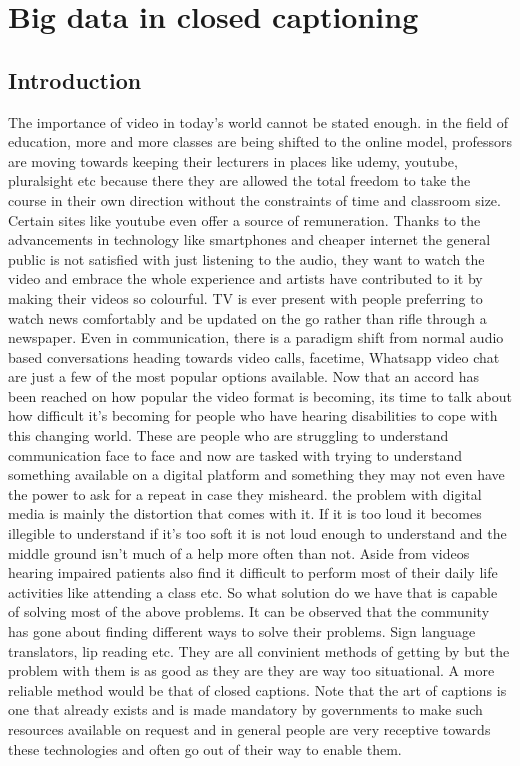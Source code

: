 \documentclass[sigconf]{acmart}
\begin{document}
\section{Big data in closed captioning}

\subsection{Introduction}

The importance of video in today's world cannot be stated enough. in the field of education, more and more classes are being shifted to the online model, professors are moving towards keeping their lecturers in places like udemy, youtube, pluralsight etc because there they are allowed the total freedom to take the course in their own direction without the constraints of time and classroom size. Certain sites like youtube even offer a source of remuneration. Thanks to the advancements in technology like smartphones and cheaper internet the general public is not satisfied with just listening to the audio, they want to watch the video and embrace the whole experience and artists have contributed to it by making their videos so colourful. TV is ever present with people preferring to watch news comfortably and be updated on the go rather than rifle through a newspaper. Even in communication, there is a paradigm shift from normal audio based conversations heading towards video calls, facetime, Whatsapp video chat are just a few of the most popular options available.
\newline
Now that an accord has been reached on how popular the video format is becoming, its time to talk about how difficult it's becoming for people who have hearing disabilities to cope with this changing world. These are people who are struggling to understand communication face to face and now are tasked with trying to understand something available on a digital platform and something they may not even have the power to ask for a repeat in case they misheard. the problem with digital media is mainly the distortion that comes with it. If it is too loud it becomes illegible to understand if it's too soft it is not loud enough to understand and the middle ground isn't much of a help more often than not. Aside from videos hearing impaired patients also find it difficult to perform most of their daily life activities like attending a class etc.
\newline
So what solution do we have that is capable of solving most of the above problems. It can be observed that the community has gone about finding different ways to solve their problems. Sign language translators, lip reading etc. They are all convinient methods of getting by but the problem with them is as good as they are they are way too situational. A more reliable method would be that of closed captions. Note that the art of captions is one that already exists and is made mandatory by governments to make such resources available on request and in general people are very receptive towards these technologies and often go out of their way to enable them.
\end{document}
